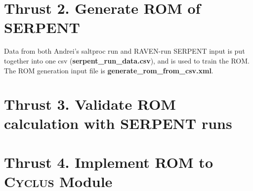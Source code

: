 \documentclass{article}
\newcommand{\Cyclus}{\textsc{Cyclus}\xspace}%
\begin{document}
\section*{Thrust 2. Generate \gls{ROM} of SERPENT}
Data from both Andrei's saltproc run and RAVEN-run SERPENT
input is put together into one csv (\textbf{serpent\_run\_data.csv}), and is used to train the ROM. The ROM generation input file
is \textbf{generate\_rom\_from\_csv.xml}. 

\section*{Thrust 3. Validate \gls{ROM} calculation with SERPENT runs}


\section*{Thrust 4. Implement \gls{ROM} to \Cyclus Module}


\pagebreak
\end{document}
